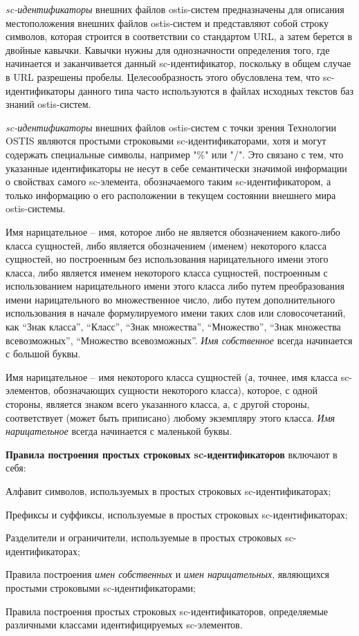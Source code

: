 \textit{sc-идентификаторы} внешних файлов ostis-систем предназначены для описания местоположения внешних файлов ostis-систем и представляют собой строку символов, которая строится в соответствии со стандартом URL, а затем берется в двойные кавычки. Кавычки нужны для однозначности определения того, где начинается и заканчивается данный sc-идентификатор, поскольку в общем случае в URL разрешены пробелы. Целесообразность этого обусловлена тем, что sc-идентификаторы данного типа часто используются в файлах исходных текстов баз знаний ostis-систем.

\textit{sc-идентификаторы} внешних файлов ostis-систем с точки зрения Технологии OSTIS являются простыми строковыми sc-идентификаторами, хотя и могут содержать специальные символы, например "\%"{} или "/"{}. Это связано с тем, что указанные идентификаторы не несут в себе семантически значимой информации о свойствах самого sc-элемента, обозначаемого таким sc-идентификатором, а только информацию о его расположении в текущем состоянии внешнего мира ostis-системы.


Имя нарицательное -- имя, которое либо не является обозначением какого-либо класса сущностей, либо является обозначением (именем) некоторого класса сущностей, но построенным без использования нарицательного имени этого класса, либо является именем некоторого класса сущностей, построенным с использованием нарицательного имени этого класса либо путем преобразования имени нарицательного во множественное число, либо путем дополнительного использования в начале формулируемого имени таких слов или словосочетаний, как ``Знак класса'', ``Класс'', ``Знак множества'', ``Множество'', ``Знак множества всевозможных'', ``Множество всевозможных''. \textit{Имя собственное} всегда начинается с большой буквы.

Имя нарицательное -- имя некоторого класса сущностей (а, точнее, имя класса sc-элементов, обозначающих сущности некоторого класса), которое, с одной стороны, является знаком всего указанного класса, а, с другой стороны, соответствует (может быть приписано) любому экземпляру этого класса. \textit{Имя нарицательное} всегда начинается с маленькой буквы.

\textbf{Правила построения простых строковых sc-идентификаторов} включают в себя:
\begin{textitemize}
	\item Алфавит символов, используемых в простых строковых sc-идентификаторах;
	\item Префиксы и суффиксы, используемые в простых строковых sc-идентификаторах;
	\item Разделители и ограничители, используемые в простых строковых sc-идентификаторах;
	\item Правила построения \textit{имен собственных} и \textit{имен нарицательных}, являющихся простыми строковыми sc-идентификаторами;
	\item Правила построения простых строковых sc-идентификаторов, определяемые различными классами идентифицируемых sc-элементов.
\end{textitemize}


